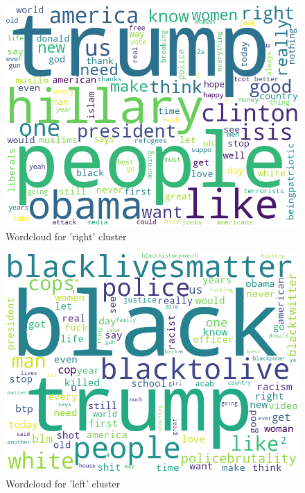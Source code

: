 \documentclass[12pt, authoryear]{elsarticle}
\begin{document}
\begin{figure}[H]
\includegraphics[width=5in]{wordcloud2}
\centering
\caption{Wordcloud for 'right' cluster}
\label{wordcloud:1}
\end{figure}

\begin{figure}[H]
\includegraphics[width=5in]{wordcloud1}
\centering
\caption{Wordcloud for 'left' cluster}
\label{wordcloud:2}
\end{figure}
\end{document}
